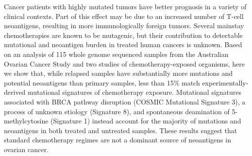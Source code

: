 Cancer patients with highly mutated tumors have better prognosis in a variety of clinical contexts. Part of this effect may be due to an increased number of T-cell neoantigens, resulting in more immunologically foreign tumors. Several mainstay chemotherapies are known to be mutagenic, but their contribution to detectable mutational and neoantigen burden in treated human cancers is unknown. Based on an analysis of 115 whole genome sequenced samples from the Australian Ovarian Cancer Study and two studies of chemotherapy-exposed organisms, here we show that, while relapsed samples have substantially more mutations and potential neoantigens than primary samples, less than 15\% match experimentally-derived mutational signatures of chemotherapy exposure. Mutational signatures associated with BRCA pathway disruption (COSMIC Mutational Signature 3), a process of unknown etiology (Signature 8), and spontaneous deamination of 5-methylcytosine (Signature 1) instead account for the majority of mutations and neoantigens in both treated and untreated samples. These results suggest that standard chemotherapy regimes are not a dominant source of neoantigens in ovarian cancer.

